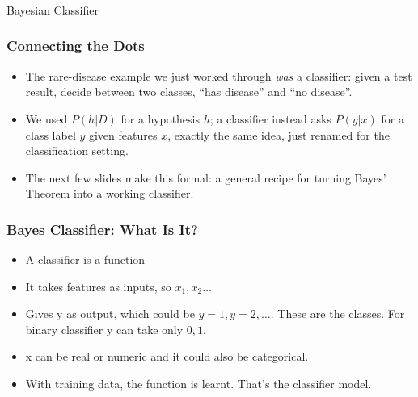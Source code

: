 \begin{frame}[fragile]\frametitle{}
\begin{center}
{\Large Bayesian Classifier}
\end{center}

\end{frame}

\begin{frame}[fragile]\frametitle{Connecting the Dots}
\begin{itemize}
\item The rare-disease example we just worked through \emph{was} a classifier: given a test result, decide between two classes, ``has disease'' and ``no disease''.
\item We used $P(h|D)$ for a hypothesis $h$; a classifier instead asks $P(y|x)$ for a class label $y$ given features $x$, exactly the same idea, just renamed for the classification setting.
\item The next few slides make this formal: a general recipe for turning Bayes' Theorem into a working classifier.
\end{itemize}
\end{frame}


\begin{frame}[fragile]\frametitle{Bayes Classifier: What Is It?}
	\begin{itemize}
	\item A classifier is a function
	\item It takes features as inputs, so $x_1,x_2 \ldots$
	\item Gives y as output, which could be $y=1,y=2,\ldots$. These are the classes. For binary classifier y can take only $0,1$.
	\item x can be real or numeric and it could also be categorical.
	\item With training data, the function is learnt. That's the classifier model.
	\end{itemize}

\end{frame}

